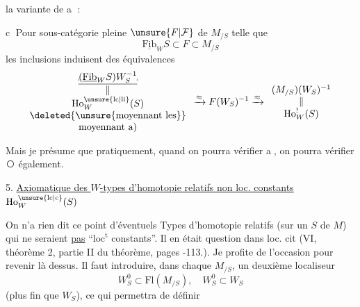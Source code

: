 la variante de \textcircled{a} :

\textcircled{c} Pour  sous-catégorie pleine $\unsure{F|\mathcal F}$ de $M_{/S}$ telle que
\[
\underline{\mathrm{Fib}}_{W}S\subset F\subset M_{/S}
\]
les inclusions induisent des équivalences
\[
\begin{array}{c}
\underline{\rule[-.24ex]{.08ex}{.48ex}\vphantom{F}(\underline{\mathrm{Fib}}_W S)W_S^{-1}\rule[-.24ex]{.08ex}{.48ex}}\\
\Vert\\
\mathrm{Ho}^{\unsure{\mathrm{lc}|\mathrm{li}}}_{W}(S)\\
\text{\deleted{\unsure{moyennant les}}}\\
\text{moyennant a)}
\end{array}
\xrightarrow{\approx} F(W_S)^{-1}
\xrightarrow{\approx}
\begin{array}{c}(M_{/S})(W_{S})^{-1}\\ \Vert\\ \mathrm{Ho}^{!}_{W}(S)\end{array}
\]

Mais je présume que pratiquement, quand on pourra vérifier \textcircled{a}, on pourra vérifier \textcircled{} également.

5. \uline{Axiomatique des $W$-types d'homotopie relatifs non loc. constants} $\mathrm{Ho}^{\unsure{\mathrm{lc}|\mathrm{c}}}_{W}(S)$

On n'a rien dit  ce point d'éventuels Types d'homotopie relatifs (sur un  $S$ de $M$) qui ne seraient \uline{pas} ``$\mathrm{loc}^{\mathrm{t}}$ constants''. Il en était question  dans loc. cit (VI, théorème  2, partie II du théorème\unsure{)}, pages -113.). Je profite de l'occasion pour revenir là dessus. Il faut introduire, dans chaque $M_{/S}$, un deuxième localiseur
\[
W_S^0\subset\mathrm{Fl}(M_{/S}),\quad W_S^0\subset W_S
\]
(plus fin que $W_S$), ce qui permettra de définir
